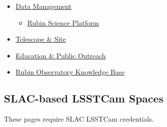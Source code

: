 \begin{small}
\begin{itemize}
\begin{itemize}
		\item \href{https://confluence.lsstcorp.org/pages/viewpage.action?pageId=100173626}{Verification \& Validation Documentation}
		\item \href{https://confluence.lsstcorp.org/display/SYSENG/Hazard+Mitigation+Verification+Documentation}{Hazard Verification Documentation}
		\item \href{https://confluence.lsstcorp.org/display/RM/Risk+Management+on+JIRA}{Risk Management}
		\item \href{https://confluence.lsstcorp.org/pages/viewpage.action?pageId=3113550}{Telescope \& Site Change Control}
		\item MagicDraw importing, setup, usage instructions
	\end{itemize}
	\item \href{https://confluence.lsstcorp.org/display/DM/Data+Management+Home}{Data Management}
	\begin{itemize}
		\item \href{https://confluence.lsstcorp.org/display/LSP/Science+Platform+Operations+Home}{Rubin Science Platform}
	\end{itemize}
	\item \href{https://https//confluence.lsstcorp.org/pages/viewpage.action?pageId=1507765}{Telescope \& Site}
	\item \href{https://confluence.lsstcorp.org/pages/viewpage.action?pageId=25690606}{Education \& Public Outreach}
	\item \href{https://confluence.lsstcorp.org/display/LKB/Rubin+Lessons+Learned}{Rubin Observatory Knowledge Base}
\end{itemize}

\subsection{SLAC-based LSSTCam Spaces}
These pages require SLAC LSSTCam credentials.


\end{small}
